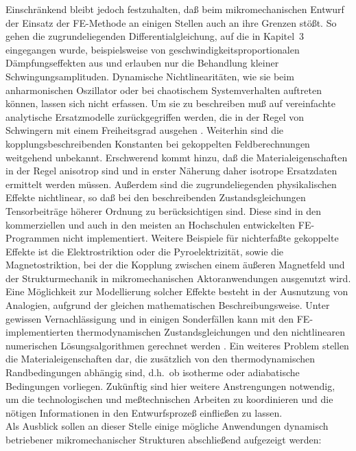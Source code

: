 %
Einschränkend bleibt jedoch festzuhalten, daß beim mikromechanischen
Entwurf der Einsatz der FE-Methode an einigen Stellen auch an ihre Grenzen
stößt. So gehen die zugrundeliegenden Differentialgleichung, auf die in
Kapitel~3 eingegangen wurde, beispielsweise von
geschwindigkeitsproportionalen Dämpfungseffekten
aus und erlauben nur die Behandlung kleiner Schwingungsamplituden.
Dynamische Nichtlinearitäten, wie sie beim anharmonischen Oszillator oder
bei chaotischem Systemverhalten auftreten können, lassen sich nicht
erfassen. Um sie zu beschreiben muß auf vereinfachte analytische
Ersatzmodelle zurückgegriffen werden, die in der Regel von Schwingern mit
einem Freiheitsgrad ausgehen \cite{Pra93,Til93}. Weiterhin sind die
kopplungsbeschreibenden Konstanten bei
gekoppelten Feldberechnungen weitgehend unbekannt. Erschwerend kommt hinzu,
daß die Materialeigenschaften in der Regel anisotrop sind und in erster
Näherung daher isotrope Ersatzdaten ermittelt werden müssen. Außerdem sind
die zugrundeliegenden physikalischen Effekte nichtlinear, so daß bei den
beschreibenden Zustandsgleichungen Tensorbeiträge höherer Ordnung zu
berücksichtigen sind. Diese sind in den kommerziellen und auch in den
meisten an Hochschulen entwickelten FE-Programmen nicht implementiert.
Weitere Beispiele für nichterfaßte gekoppelte Effekte ist die
Elektrostriktion oder die Pyroelektrizität, sowie die Magnetostriktion, bei
der die Kopplung zwischen einem äußeren Magnetfeld
und der Strukturmechanik in mikromechanischen Aktoranwendungen ausgenutzt
wird. Eine Möglichkeit zur Modellierung solcher Effekte besteht in der
Ausnutzung von Analogien, aufgrund der gleichen mathematischen
Beschreibungsweise. Unter
gewissen Vernachlässigung und in einigen Sonderfällen kann mit den
FE-implementierten thermodynamischen Zustandsgleichungen und den
nichtlinearen numerischen Lösungsalgorithmen gerechnet werden \cite{Goetz}.
Ein weiteres Problem stellen die Materialeigenschaften dar, die zusätzlich von
den thermodynamischen Randbedingungen abhängig sind, d.h.\ ob isotherme oder
adiabatische Bedingungen vorliegen. Zukünftig sind hier weitere Anstrengungen
notwendig, um die technologischen und meßtechnischen Arbeiten zu
koordinieren und die nötigen Informationen in den Entwurfsprozeß
einfließen zu lassen.\\
%
Als Ausblick sollen an dieser Stelle einige mögliche Anwendungen
dynamisch betriebener mikromechanischer Strukturen abschließend
aufgezeigt werden:
%
